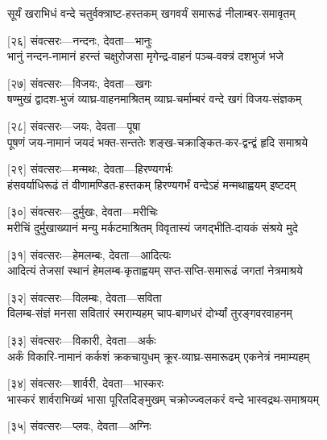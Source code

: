 \twolineshloka
{सूर्यं खराभिधं वन्दे चतुर्वक्त्राष्ट-हस्तकम्}
{खगवर्यं समारूढं नीलाम्बर-समावृतम्} %

[२६] संवत्सरः—नन्दनः, देवता—भानुः\\

\twolineshloka
{भानुं नन्दन-नामानं हरन्तं चक्षुरोजसा}
{मृगेन्द्र-वाहनं पञ्च-वक्त्रं दशभुजं भजे} %

[२७] संवत्सरः—विजयः, देवता—खगः\\

\twolineshloka
{षण्मुखं द्वादश-भुजं व्याघ्र-वाहनमाश्रितम्}
{व्याघ्र-चर्माम्बरं वन्दे खगं विजय-संज्ञकम्} %

[२८] संवत्सरः—जयः, देवता—पूषा\\

\twolineshloka
{पूषणं जय-नामानं जयदं भक्त-सन्ततेः}
{शङ्ख-चक्राङ्कित-कर-द्वन्द्वं हृदि समाश्रये} %

[२९] संवत्सरः—मन्मथः, देवता—हिरण्यगर्भः\\

\twolineshloka
{हंसवर्याधिरूढं तं वीणामण्डित-हस्तकम्}
{हिरण्यगर्भं वन्देऽहं मन्मथाह्वयम् इष्टदम्} %

[३०] संवत्सरः—दुर्मुखः, देवता—मरीचिः\\

\twolineshloka
{मरीचिं दुर्मुखाख्यानं मन्यु मर्कटमाश्रितम्}
{विवृतास्यं जगद्भीति-दायकं संश्रये मुदे} %

[३१] संवत्सरः—हेमलम्बः, देवता—आदित्यः\\

\twolineshloka
{आदित्यं तेजसां स्थानं हेमलम्ब-कृताह्वयम्}
{सप्त-सप्ति-समारूढं जगतां नेत्रमाश्रये} %

[३२] संवत्सरः—विलम्बः, देवता—सविता\\

\twolineshloka
{विलम्ब-संज्ञं मनसा सवितारं स्मराम्यहम्}
{चाप-बाणधरं दोर्भ्यां तुरङ्गवरवाहनम्} %

[३३] संवत्सरः—विकारी, देवता—अर्कः\\

\twolineshloka
{अर्कं विकारि-नामानं कर्कशं क्रकचायुधम्}
{क्रूर-व्याघ्र-समारूढम् एकनेत्रं नमाम्यहम्} %

[३४] संवत्सरः—शार्वरी, देवता—भास्करः\\

\twolineshloka
{भास्करं शार्वराभिख्यं भासा पूरितदिङ्मुखम्}
{चक्रोज्ज्वलकरं वन्दे भास्वद्रथ-समाश्रयम्} %

[३५] संवत्सरः—प्लवः, देवता—अग्निः\\

